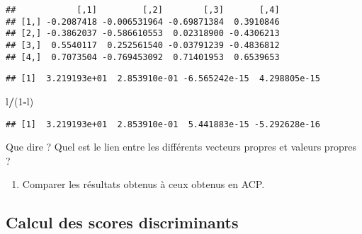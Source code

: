 \documentclass[
]{article}
\newenvironment{Shaded}{\begin{snugshade}}{\end{snugshade}}
\newcommand{\CommentTok}[1]{\textcolor[rgb]{0.56,0.35,0.01}{\textit{#1}}}
\newcommand{\DecValTok}[1]{\textcolor[rgb]{0.00,0.00,0.81}{#1}}
\newcommand{\KeywordTok}[1]{\textcolor[rgb]{0.13,0.29,0.53}{\textbf{#1}}}
\newcommand{\NormalTok}[1]{#1}
\newcommand{\OperatorTok}[1]{\textcolor[rgb]{0.81,0.36,0.00}{\textbf{#1}}}
\newcommand{\StringTok}[1]{\textcolor[rgb]{0.31,0.60,0.02}{#1}}
\providecommand{\tightlist}{%
  \setlength{\itemsep}{0pt}\setlength{\parskip}{0pt}}
\begin{document}
\begin{verbatim}
##            [,1]         [,2]        [,3]       [,4]
## [1,] -0.2087418 -0.006531964 -0.69871384  0.3910846
## [2,] -0.3862037 -0.586610553  0.02318900 -0.4306213
## [3,]  0.5540117  0.252561540 -0.03791239 -0.4836812
## [4,]  0.7073504 -0.769453092  0.71401953  0.6539653
\end{verbatim}

\begin{Shaded}
\end{Shaded}

\begin{verbatim}
## [1]  3.219193e+01  2.853910e-01 -6.565242e-15  4.298805e-15
\end{verbatim}

\begin{Shaded}
\begin{Highlighting}[]
\NormalTok{l}\OperatorTok{/}\NormalTok{(}\DecValTok{1}\OperatorTok{-}\NormalTok{l)}
\end{Highlighting}
\end{Shaded}

\begin{verbatim}
## [1]  3.219193e+01  2.853910e-01  5.441883e-15 -5.292628e-16
\end{verbatim}

Que dire ? Quel est le lien entre les différents vecteurs propres et
valeurs propres ?

\begin{enumerate}
\def\labelenumi{\arabic{enumi}.}
\setcounter{enumi}{20}
\tightlist
\item
  Comparer les résultats obtenus à ceux obtenus en ACP.
\end{enumerate}

\hypertarget{calcul-des-scores-discriminants}{%
\subsection{Calcul des scores
discriminants}\label{calcul-des-scores-discriminants}}
\end{document}
